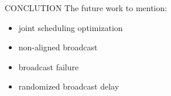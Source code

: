 \documentclass[10pt, conference, letterpaper]{IEEEtran}
\begin{document}
    \begin{section}{CONCLUTION}
        \label{sec:conclusion}
        The future work to mention:
        \begin{itemize}
            \item joint scheduling optimization
            \item non-aligned broadcast
            \item broadcast failure
            \item randomized broadcast delay
        \end{itemize}
    \end{section}

    
    
\end{document}
